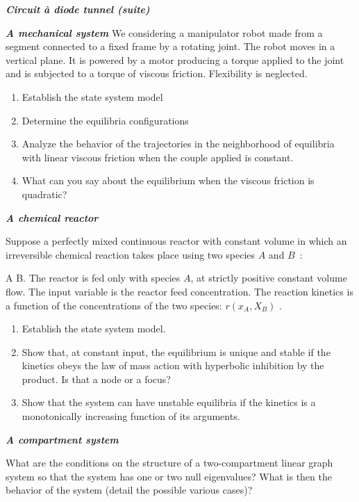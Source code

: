 {\begin{exemple}{\bf \em Circuit {à} diode tunnel (suite)}
\begin{exercice} {\bf \em A mechanical system}
We considering a manipulator robot made from a segment connected to a fixed frame by a rotating joint. 
The robot moves in a vertical plane. It is powered by a motor producing a torque
applied to the joint and is subjected to a torque of viscous friction. Flexibility is neglected.

\begin{enumerate}
\item Establish the state system model
\item Determine the equilibria configurations
\item Analyze the behavior of the trajectories in the neighborhood of
equilibria with linear viscous friction when the couple
applied is constant.
\item What can you say about the equilibrium when the viscous friction
is quadratic?
\end{enumerate}
\end{exercice}
\vv

\begin{exercice}{\bf \em A chemical reactor}

Suppose a perfectly mixed continuous reactor with constant volume 
in which an irreversible chemical reaction takes place 
using two species $A$ and $B$~:

\eqnn
A \longrightarrow B.
\eeqnn
The reactor is fed only with species $A$, at 
strictly positive constant volume flow. The input variable is
the reactor feed concentration. The reaction kinetics
is a function of the concentrations of the two species: $r(x_A,X_B)$ .

\begin{enumerate}
\item Establish the state system model.
\item Show that, at constant input, the equilibrium is unique and
stable if the kinetics obeys the law of mass action with hyperbolic inhibition
by the product. Is that a node or a focus?

\item Show that the system can have unstable equilibria 
if the kinetics is a monotonically increasing function of its
arguments.
\end{enumerate}
\end{exercice}
\vv

\begin{exercice} {\bf \em A compartment system}

What are the conditions on the structure of a two-compartment linear graph system so that the system has
one or two null eigenvalues? What is then the behavior of the
system (detail the possible various cases)?


\end{exercice}
\end{exemple}}
